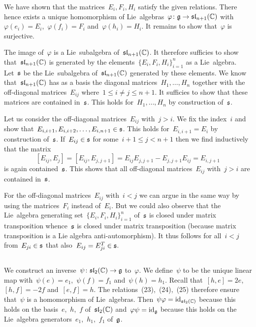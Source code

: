 We have shown that the matrices~$E_i, F_i, H_i$ satisfy the given relations.
There hence exists a unique homomorphism of Lie~algebras~$\varphi \colon \mathfrak{g} \to \mathfrak{sl}_{n+1}(\mathbb{C})$ with~$\varphi(e_i) = E_i$,~$\varphi(f_i) = F_i$ and~$\varphi(h_i) = H_i$.
It remains to show that~$\varphi$ is surjective.

The image of~$\varphi$ is a Lie~subalgebra of~$\mathfrak{sl}_{n+1}(\mathbb{C})$.
It therefore sufficies to show that~$\mathfrak{sl}_{n+1}(\mathbb{C})$ is generated by the elements~$\{E_i, F_i, H_i\}_{i=1}^n$ as a Lie~algebra.
Let~$\mathfrak{s}$ be the Lie~subalgebra of~$\mathfrak{sl}_{n+1}(\mathbb{C})$ generated by these elements.
We know that~$\mathfrak{sl}_{n+1}(\mathbb{C})$ has as a basis the diagonal matrices~$H_1, \dotsc, H_n$ together with the off-diagonal matrices~$E_{ij}$ where~$1 \leq i \neq j \leq n+1$.
It sufficies to show that these matrices are contained in~$\mathfrak{s}$.
This holds for~$H_1, \dotsc, H_n$ by construction of~$\mathfrak{s}$.

Let us consider the off-diagonal matrices~$E_{ij}$ with~$j > i$.
We fix the index~$i$ and show that~$E_{i,i+1}, E_{i,i+2}, \dotsc, E_{i,n+1} \in \mathfrak{s}$.
This holds for~$E_{i,i+1} = E_i$ by construction of~$\mathfrak{s}$.
If~$E_{ij} \in \mathfrak{s}$ for some~$i+1 \leq j < n+1$ then we find inductively that the matrix
\[
  [E_{ij}, E_j]
  =
  [E_{ij}, E_{j,j+1}]
  =
  E_{ij} E_{j,j+1} - E_{j,j+1} E_{ij}
  =
  E_{i,j+1}
\]
is again contained~$\mathfrak{s}$.
This shows that all off-diagonal matrices~$E_{ij}$ with~$j > i$ are contained in~$\mathfrak{s}$.

For the off-diagonal matrices~$E_{ij}$ with~$i < j$ we can argue in the same way by using the matrices~$F_i$ instead of~$E_i$.
But we could also observe that the Lie~algebra generating set~$\{E_i, F_i, H_i\}_{i=1}^n$ of~$\mathfrak{s}$ is closed under matrix transposition whence~$\mathfrak{s}$ is closed under matrix transposition (because matrix transposition is a Lie algebra anti-automorphism).
It thus follows for all~$i < j$ from~$E_{ji} \in \mathfrak{s}$ that also~$E_{ij} = E_{ji}^T \in \mathfrak{s}$.





\subsection{}

We construct an inverse~$\psi \colon \mathfrak{sl}_2(\mathbb{C}) \to \mathfrak{g}$ to~$\varphi$.
We define~$\psi$ to be the unique linear map with~$\psi(e) = e_1$,~$\psi(f) = f_1$ and~$\psi(h) = h_1$.
Recall that~$[h,e] = 2e$,~$[h,f] = -2f$ and~$[e,f] = h$.
The relations~(23),~(24),~(25) therefore ensure that~$\psi$ is a homomorphism of Lie~algebras.
Then~$\psi \varphi = \operatorname{id}_{\mathfrak{sl}_2(\mathbb{C})}$ because this holds on the basis~$e$,~$h$,~$f$ of~$\mathfrak{sl}_2(\mathbb{C})$ and~$\varphi \psi = \operatorname{id}_{\mathfrak{g}}$ because this holds on the Lie~algebra generators~$e_1$,~$h_1$,~$f_1$ of~$\mathfrak{g}$.



